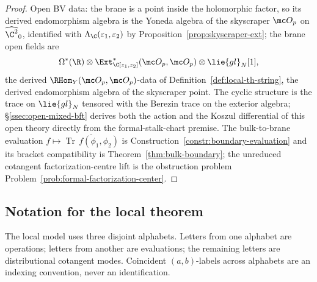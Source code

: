 \documentclass[11pt]{memoir}
\begin{document}
\begin{proof}
  Open BV data: the brane is a point inside the holomorphic factor, so
  its derived endomorphism algebra is the Yoneda algebra of the
  skyscraper \(\mc O_p\) on \(\widehat{\C^2}_0\), identified with
  \(\Lambda_{\C}(\varepsilon_1,\varepsilon_2)\) by
  Proposition~\ref{prop:skyscraper-ext}; the brane open fields are
  \[
    \Omega^*(\R)\otimes\Ext^*_{\C[z_1,z_2]}(\mc O_p,\mc O_p)
      \otimes\lie{gl}_N[1],
  \]
  the derived
  \(\RHom_Y(\mc O_p,\mc O_p)\)-data of Definition~\ref{def:local-th-string},
  the derived endomorphism algebra of the skyscraper point. The cyclic structure
  is the trace on \(\lie{gl}_N\) tensored with the Berezin trace on the
  exterior algebra; \S\ref{ssec:open-mixed-bft} derives both the action
  and the Koszul differential of this open theory directly from the
  formal-stalk-chart premise. The bulk-to-brane evaluation
  \(f\mapsto\overline{\operatorname{Tr}\,f(\phi_1,\phi_2)}\) is
  Construction~\ref{constr:boundary-evaluation} and its bracket
  compatibility is Theorem~\ref{thm:bulk-boundary}; the unreduced
  cotangent factorization-centre lift is the obstruction problem
  Problem~\ref{prob:formal-factorization-center}.
\end{proof}

\subsection{Notation for the local theorem}\label{ssec:intro-notation-index}

The local model uses three disjoint alphabets.  Letters from one
alphabet are operations; letters from another are evaluations; the
remaining letters are distributional cotangent modes.  Coincident
\((a,b)\)-labels across alphabets are an indexing convention, never an
identification.
\end{document}
